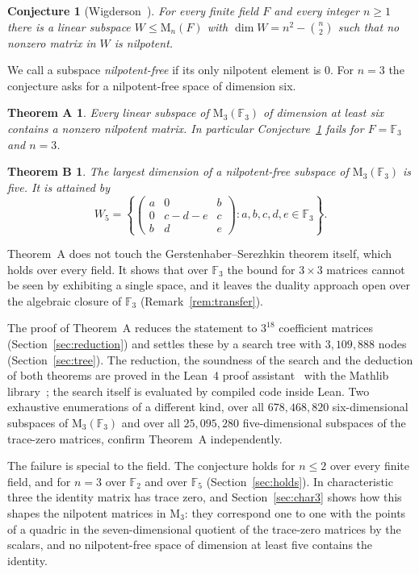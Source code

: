 \documentclass[11pt]{amsart}
\newtheorem{conjecture}[theorem]{Conjecture}
\newtheorem*{theoremA}{Theorem A}
\newtheorem*{theoremB}{Theorem B}
\theoremstyle{definition}
\theoremstyle{remark}
\numberwithin{equation}{section}
\newcommand{\F}{\mathbb{F}}
\newcommand{\M}{\mathrm{M}}
\begin{document}
\begin{conjecture}[{Wigderson~\cite[Conjecture~8]{Wi}}]\label{conj:W}
For every finite field $F$ and every integer $n\ge1$ there is a linear subspace $W\le\M_n(F)$ with $\dim W=n^2-\binom n2$ such that no nonzero matrix in $W$ is nilpotent.
\end{conjecture}

We call a subspace \emph{nilpotent-free} if its only nilpotent element is $0$. For $n=3$ the conjecture asks for a nilpotent-free space of dimension six.

\begin{theoremA}
Every linear subspace of $\M_3(\F_3)$ of dimension at least six contains a nonzero nilpotent matrix. In particular Conjecture~\ref{conj:W} fails for $F=\F_3$ and $n=3$.
\end{theoremA}

\begin{theoremB}
The largest dimension of a nilpotent-free subspace of $\M_3(\F_3)$ is five. It is attained by
\begin{equation}\label{eq:W5}
W_5=\left\{\begin{pmatrix} a&0&b\\ 0&c-d-e&c\\ b&d&e\end{pmatrix} : a,b,c,d,e\in\F_3\right\}.
\end{equation}
\end{theoremB}

Theorem~A does not touch the Gerstenhaber--Serezhkin theorem itself, which holds over every field. It shows that over $\F_3$ the bound for $3\times3$ matrices cannot be seen by exhibiting a single space, and it leaves the duality approach open over the algebraic closure of $\F_3$ (Remark~\ref{rem:transfer}).

The proof of Theorem~A reduces the statement to $3^{18}$ coefficient matrices (Section~\ref{sec:reduction}) and settles these by a search tree with $3{,}109{,}888$ nodes (Section~\ref{sec:tree}). The reduction, the soundness of the search and the deduction of both theorems are proved in the Lean~4 proof assistant~\cite{MU} with the Mathlib library~\cite{Mathlib}; the search itself is evaluated by compiled code inside Lean. Two exhaustive enumerations of a different kind, over all $678{,}468{,}820$ six-dimensional subspaces of $\M_3(\F_3)$ and over all $25{,}095{,}280$ five-dimensional subspaces of the trace-zero matrices, confirm Theorem~A independently.

The failure is special to the field. The conjecture holds for $n\le2$ over every finite field, and for $n=3$ over $\F_2$ and over $\F_5$ (Section~\ref{sec:holds}). In characteristic three the identity matrix has trace zero, and Section~\ref{sec:char3} shows how this shapes the nilpotent matrices in $\M_3$: they correspond one to one with the points of a quadric in the seven-dimensional quotient of the trace-zero matrices by the scalars, and no nilpotent-free space of dimension at least five contains the identity.
\end{document}
